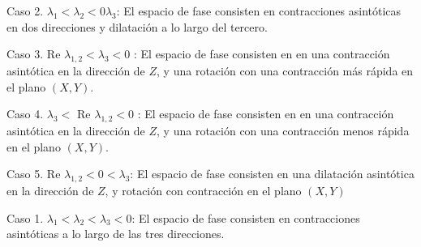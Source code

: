 \documentclass[a4paper,10pt]{article}
\begin{document}
Caso 2. $\lambda_1 < \lambda_2 < 0 \lambda_3$: El espacio de fase consisten en contracciones asintóticas
en dos direcciones y dilatación a lo largo del tercero.


Caso 3. Re $\lambda_{1,2} < \lambda_3 < 0$ : El espacio de fase consisten en en una contracción asintótica
en la dirección de $Z$, y una rotación con una contracción más rápida en el plano
$(X,Y)$.


Caso 4. $\lambda_3 <$ Re $\lambda_{1,2} < 0$ : El espacio de fase consisten en en una contracción asintótica
en la dirección de $Z$, y una rotación con una contracción menos rápida en el plano
$(X,Y)$.


Caso 5. Re $\lambda_{1,2} < 0 < \lambda_3$: El espacio de fase consisten en una dilatación asintótica
en la dirección de $Z$, y rotación con contracción en el plano $(X,Y)$


Caso 1. $\lambda_1 < \lambda_2 < \lambda_3 < 0$: El espacio de fase consisten en contracciones asintóticas
a lo largo de las tres direcciones.

\end{document}
